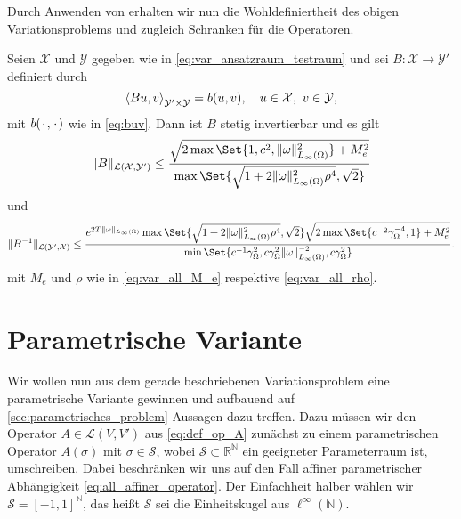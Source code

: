 Durch Anwenden von  erhalten wir nun die Wohldefiniertheit des obigen Variationsproblems und zugleich Schranken für die Operatoren.

\begin{Lemma}
\label{lemma:2.2}
    Seien $\mathcal X$ und $\mathcal Y$ gegeben wie in \eqref{eq:var_ansatzraum_testraum} und sei $B \colon \mathcal X \to \mathcal Y'$ definiert durch
    \begin{equation}
        \left\langle Bu,v\right\rangle_{\mathcal Y' \times \mathcal Y}  = b(u, v), \quad u \in \mathcal X,~ v \in \mathcal Y,
    \end{equation}
    mit $b({\mkern2mu\cdot\mkern2mu}, {\mkern2mu\cdot\mkern2mu})$ wie in \eqref{eq:buv}.
    Dann ist $B$ stetig invertierbar und es gilt
    \begin{equation}
        \norm{B}_{\mathcal L(\mathcal X, \mathcal Y')}
        \leq
        \frac{\sqrt{2 \max\Set{1, c^{2}, \norm{\omega}_{L_{\infty}(\Omega)}^{2}} + M_{e}^{2}}}{\max\Set{\sqrt{1 + 2 \norm{\omega}_{L_{\infty}(\Omega)}^{2} \rho^{4}}, \sqrt{2} }}
    \end{equation}
    und
    \begin{equation}
        \norm{B^{-1}}_{\mathcal L( \mathcal Y', \mathcal X)}
        \leq \frac{e^{2 T \norm{\omega}_{L_{\infty}(\Omega)}} \max\Set{\sqrt{1 + 2 \norm{\omega}_{L_{\infty}(\Omega)}^{2} \rho^{4}}, \sqrt{2}} \sqrt{2 \max\Set{c^{-2} \gamma_{\Omega}^{-4}, 1} + M_{e}^{2}}}{\min\Set{c^{-1} \gamma_{\Omega}^{2}, c \gamma_{\Omega}^{2} \norm{\omega}_{L_{\infty}(\Omega)}^{-2}, c \gamma_{\Omega}^{2} }}.
    \end{equation}
    mit $M_{e}$ und $\rho$ wie in \eqref{eq:var_all_M_e} respektive \eqref{eq:var_all_rho}.
\end{Lemma}

\section{Parametrische Variante} %
\label{sec:parametrische_variante}

Wir wollen nun aus dem gerade beschriebenen Variationsproblem eine parametrische Variante gewinnen und aufbauend auf \autoref{sec:parametrisches_problem} Aussagen dazu treffen.
Dazu müssen wir den Operator $A \in \mathcal L(V, V')$ aus \eqref{eq:def_op_A} zunächst zu einem parametrischen Operator $A(\sigma)$ mit $\sigma \in \mathcal S$, wobei $\mathcal S \subset \mathbb{R}^{\mathbb{N}}$ ein geeigneter Parameterraum ist, umschreiben.
Dabei beschränken wir uns auf den Fall affiner parametrischer Abhängigkeit \eqref{eq:all_affiner_operator}.
Der Einfachheit halber wählen wir $\mathcal S = [-1, 1]^{\mathbb{N}}$, das heißt $\mathcal S$ sei die Einheitskugel aus $\ell^{\infty}(\mathbb{N})$.

